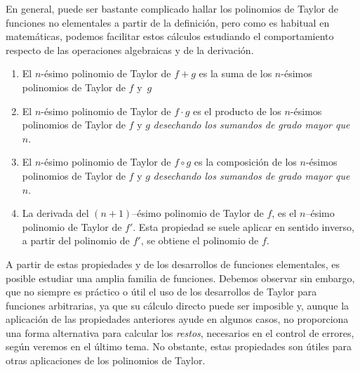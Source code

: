 En general, puede ser bastante complicado hallar los polinomios de Taylor de funciones no elementales a partir de la definición, pero como es habitual en matemáticas, podemos facilitar estos cálculos estudiando el comportamiento respecto de las operaciones algebraicas y de la derivación.
%
\begin{proposicion-br}
\label{prop:tayalg}
\begin{enumerate}
\item El $n$-ésimo polinomio de Taylor de $f+g$ es la suma de los $n$-ésimos polinomios de Taylor de $f$ y~$g$
\item El $n$-ésimo polinomio de Taylor de $f\cdot g$ es el producto
de los $n$-ésimos polinomios de Taylor de $f$ y $g$ \emph{desechando
los sumandos de grado mayor que~$n$}.
\item El $n$-ésimo polinomio de Taylor de $f\circ g$ es la composición
de los $n$-ésimos polinomios de Taylor de $f$ y $g$ \emph{desechando
los sumandos de grado mayor que~$n$}.
\item La derivada del $(n+1)$--ésimo polinomio de Taylor de $f$, es el
$n$--ésimo polinomio de Taylor de $f'$. Esta propiedad se
suele aplicar en sentido inverso, a partir del polinomio de $f'$, se
obtiene el polinomio de $f$.
\end{enumerate}
\end{proposicion-br}

A partir de estas propiedades y de los desarrollos de funciones elementales, es posible estudiar una amplia familia de funciones.
Debemos observar sin embargo, que no siempre es práctico o útil el uso de los desarrollos de Taylor para funciones arbitrarias, ya que su cálculo directo puede ser imposible y, aunque la aplicación de las propiedades anteriores ayude en algunos casos, no proporciona una forma alternativa para calcular los \emph{restos}, necesarios en el control de errores, según veremos en el último tema.
No obstante, estas propiedades son útiles para otras aplicaciones de los polinomios de Taylor.


